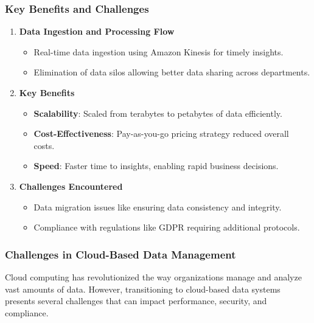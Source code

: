 \documentclass[aspectratio=169]{beamer}
\begin{document}
\begin{frame}[fragile]
    \frametitle{Key Benefits and Challenges}
    \begin{enumerate}
        \item \textbf{Data Ingestion and Processing Flow}
        \begin{itemize}
            \item Real-time data ingestion using Amazon Kinesis for timely insights.
            \item Elimination of data silos allowing better data sharing across departments.
        \end{itemize}

        \item \textbf{Key Benefits}
        \begin{itemize}
            \item \textbf{Scalability}: Scaled from terabytes to petabytes of data efficiently.
            \item \textbf{Cost-Effectiveness}: Pay-as-you-go pricing strategy reduced overall costs.
            \item \textbf{Speed}: Faster time to insights, enabling rapid business decisions.
        \end{itemize}

        \item \textbf{Challenges Encountered}
        \begin{itemize}
            \item Data migration issues like ensuring data consistency and integrity.
            \item Compliance with regulations like GDPR requiring additional protocols.
        \end{itemize}
    \end{enumerate}
\end{frame}

\begin{frame}[fragile]
    \frametitle{Challenges in Cloud-Based Data Management}
    Cloud computing has revolutionized the way organizations manage and analyze vast amounts of data. However, transitioning to cloud-based data systems presents several challenges that can impact performance, security, and compliance.
\end{frame}
\end{document}
